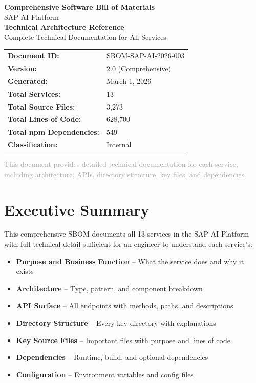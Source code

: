 \documentclass[11pt,a4paper]{article}
\begin{document}
\begin{titlepage}
\centering
\vspace*{1.5cm}
{\Huge\bfseries\textcolor{sapblue}{Comprehensive Software Bill of Materials}\\[0.5cm]}
{\LARGE SAP AI Platform}\\[1cm]
{\Large\textbf{Technical Architecture Reference}}\\[0.5cm]
{\large Complete Technical Documentation for All Services}\\[3cm]

\begin{tabular}{ll}
\textbf{Document ID:} & SBOM-SAP-AI-2026-003 \\
\textbf{Version:} & 2.0 (Comprehensive) \\
\textbf{Generated:} & March 1, 2026 \\
\textbf{Total Services:} & 13 \\
\textbf{Total Source Files:} & 3,273 \\
\textbf{Total Lines of Code:} & 628,700 \\
\textbf{Total npm Dependencies:} & 549 \\
\textbf{Classification:} & Internal \\
\end{tabular}

\vfill
{\large\textcolor{darkgray}{This document provides detailed technical documentation for each service,\\including architecture, APIs, directory structure, key files, and dependencies.}}
\end{titlepage}

\tableofcontents
\newpage

\section{Executive Summary}

This comprehensive SBOM documents all 13 services in the SAP AI Platform with full technical detail sufficient for an engineer to understand each service's:

\begin{itemize}[noitemsep]
    \item \textbf{Purpose and Business Function} -- What the service does and why it exists
    \item \textbf{Architecture} -- Type, pattern, and component breakdown
    \item \textbf{API Surface} -- All endpoints with methods, paths, and descriptions
    \item \textbf{Directory Structure} -- Every key directory with explanations
    \item \textbf{Key Source Files} -- Important files with purpose and lines of code
    \item \textbf{Dependencies} -- Runtime, build, and optional dependencies
    \item \textbf{Configuration} -- Environment variables and config files
\end{itemize}
\end{document}
